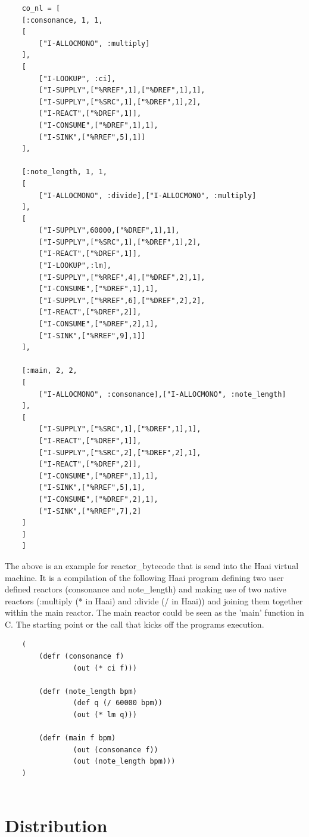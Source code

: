 \documentclass[a4paper]{book}
\begin{document}
\begin{verbatim}
	co_nl = [
	[:consonance, 1, 1,
	[
	    ["I-ALLOCMONO", :multiply]
	],
	[
	    ["I-LOOKUP", :ci],
	    ["I-SUPPLY",["%RREF",1],["%DREF",1],1],
	    ["I-SUPPLY",["%SRC",1],["%DREF",1],2],
	    ["I-REACT",["%DREF",1]],
	    ["I-CONSUME",["%DREF",1],1],
	    ["I-SINK",["%RREF",5],1]]
	],
	
	[:note_length, 1, 1,
	[
	    ["I-ALLOCMONO", :divide],["I-ALLOCMONO", :multiply]
	],
	[
	    ["I-SUPPLY",60000,["%DREF",1],1],
	    ["I-SUPPLY",["%SRC",1],["%DREF",1],2],
	    ["I-REACT",["%DREF",1]],
	    ["I-LOOKUP",:lm],
	    ["I-SUPPLY",["%RREF",4],["%DREF",2],1],
	    ["I-CONSUME",["%DREF",1],1],
	    ["I-SUPPLY",["%RREF",6],["%DREF",2],2],
	    ["I-REACT",["%DREF",2]],
	    ["I-CONSUME",["%DREF",2],1],
	    ["I-SINK",["%RREF",9],1]]
	],
	
	[:main, 2, 2,
	[
	    ["I-ALLOCMONO", :consonance],["I-ALLOCMONO", :note_length]
	],
	[
	    ["I-SUPPLY",["%SRC",1],["%DREF",1],1],
	    ["I-REACT",["%DREF",1]],
	    ["I-SUPPLY",["%SRC",2],["%DREF",2],1],
	    ["I-REACT",["%DREF",2]],
	    ["I-CONSUME",["%DREF",1],1],
	    ["I-SINK",["%RREF",5],1],
	    ["I-CONSUME",["%DREF",2],1],
	    ["I-SINK",["%RREF",7],2]
	]
	]
	]
\end{verbatim}

The above is an example for reactor\_bytecode that is send into the Haai virtual machine. It is a compilation of the following Haai program defining two user defined reactors (consonance and note\_length) and making use of two native reactors (:multiply (* in Haai) and :divide (/ in Haai)) and joining them together within the main reactor. The main reactor could be seen as the 'main' function in C. The starting point or the call that kicks off the programs execution.

\begin{verbatim}
	(
		(defr (consonance f)
		     	(out (* ci f)))
	
	    (defr (note_length bpm)
	      		(def q (/ 60000 bpm))
	            (out (* lm q)))
	
	    (defr (main f bpm)
	      		(out (consonance f))
	      		(out (note_length bpm)))
	)
	
\end{verbatim}


\chapter{Distribution}
\end{document}
